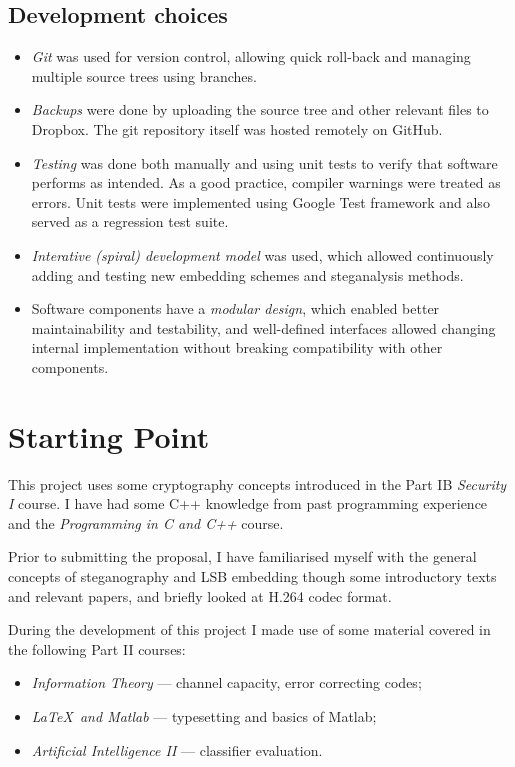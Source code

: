 \documentclass[12pt,british,twoside,notitlepage,usenames,dvipsnames,hypens,final]{report}
\numberwithin{equation}{section}
\numberwithin{figure}{section}
\begin{document}
\subsection{Development choices}
\begin{itemize}
\item \emph{Git} was used for version control, allowing quick roll-back and managing multiple source trees using branches.
\item \emph{Backups} were done by uploading the source tree and other relevant files to Dropbox. The git repository itself was hosted remotely on GitHub.
\item \emph{Testing} was done both manually and using unit tests to verify that software performs as intended. As a good practice, compiler warnings were treated as errors. Unit tests were implemented using Google Test framework and also served as a regression test suite.
\item \emph{Interative (spiral) development model} was used, which allowed continuously adding and testing new embedding schemes and steganalysis methods.
\item Software components have a \emph{modular design}, which enabled better maintainability and testability, and well-defined interfaces allowed changing internal implementation without breaking compatibility with other components.
\end{itemize}

\section{Starting Point}
This project uses some cryptography concepts introduced in the Part IB \textit{Security I} course. I have had some C++ knowledge from past programming experience and the \textit{Programming in C and C++} course. 

Prior to submitting the proposal, I have familiarised myself with the general concepts of steganography and LSB embedding though some introductory texts and relevant papers, and briefly looked at H.264 codec format.

During the development of this project I made use of some material covered in the following Part II courses:
\begin{itemize}
\item \textit{Information Theory} --- channel capacity, error correcting codes;
\item \textit{\LaTeX~and Matlab} --- typesetting and basics of Matlab;
\item \textit{Artificial Intelligence II} --- classifier evaluation.
\end{itemize}
\end{document}
